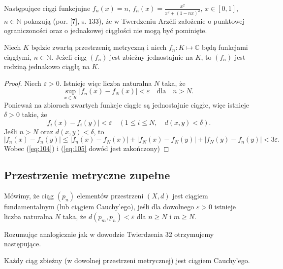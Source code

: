 \documentclass[leqno]{article}
\begin{document}
\begin{justify}
Następujące ciągi funkcjujne $f_n(x) = n$, $f_n(x) = \frac{x^2}{x^2 + {(1-nx)}^2}$, $x \in [0, 1]$, $n \in \mathbb{N}$ pokazują
(por. [7], s. 133), że w Twerdzeniu Arzéli założenie o punktowej ograniczoności oraz o jednakowej ciągłości nie mogą być pominięte.

\begin{theorem}
{
    Niech $K$ będzie zwartą przestrzenią metryczną i niech $f_n : K \mapsto \mathbb{C}$ będą
    funkcjami ciągłymi, $n \in \mathbb{N}$. Jeżeli ciąg $(f_n)$ jest zbieżny jednostajnie na $K$,
    to $(f_n)$ jest rodziną jednakowo ciągłą na $K$.
}
\end{theorem}

\begin{proof}
    Niech $\varepsilon > 0$. Istnieje więc liczba naturalna $N$ taka, że
    \[
        \sup_{x \in K}|f_n(x) - f_N(x)| < \varepsilon \quad \text{dla} \quad n > N.
    \]
    Ponieważ na zbiorach zwartych funkcje ciągłe są jednostajnie ciągłe, więc istnieje $\delta > 0$ takie, że 
    \begin{equation}\label{eq:104}
        |f_i(x) - f_i(y)| < \varepsilon \quad (1 \leqslant i \leqslant N, \quad d(x, y) < \delta).
    \end{equation}
    Jeśli $n > N$ oraz $d(x, y) < \delta$, to 
    \begin{equation}\label{eq:105}
        |f_n(x) - f_n(y)| \leqslant |f_n(x) - f_N(x)| + |f_N(x) - f_N(y)| + |f_N(y) - f_n(y)| < 3\varepsilon.
    \end{equation}
    Wobec (\ref{eq:104}) i (\ref{eq:105} dowód jest zakończony)
\end{proof}

\subsection{Przestrzenie metryczne zupełne}

\begin{defn}
    Mówimy, że ciąg $(p_n)$ elementów przestrzeni $(X, d)$ jest ciągiem fundamentalnym (lub ciągiem Cauchy'ego),
    jeśli dla dowolnego $\varepsilon > 0$ istnieje liczba naturalna $N$ taka, że $d(p_m, p_n) < \varepsilon$ dla $n \geqslant N$ i $m \geqslant N$.
\end{defn}

Rozumując analogicznie jak w dowodzie Twierdzenia 32 otrzymujemy następujące.

\begin{theorem}
{
    Każdy ciąg zbieżny (w dowolnej przestrzeni metrycznej) jest ciągiem Cauchy'ego.
}
\end{theorem}


\end{justify}
\end{document}
